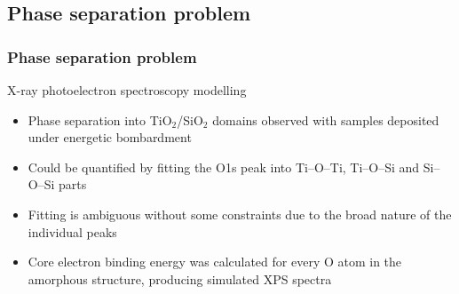 \documentclass[noamsthm,8pt,t,xcolor={dvipsnames}]{beamer}
\begin{document}
\subsection{Phase separation problem}
\begin{frame}
   \frametitle{Phase separation problem}
   \vspace{-0.45cm}
   \begin{block}{X-ray photoelectron spectroscopy modelling}
      \begin{itemize}
         \item Phase separation into TiO$_2$/SiO$_2$ domains observed with samples deposited under energetic bombardment
         \item Could be quantified by fitting the O1s peak into Ti--O--Ti, Ti--O--Si and Si--O--Si parts
         \item Fitting is ambiguous without some constraints due to the broad nature of the individual peaks
         \item Core electron binding energy was calculated for every O atom in the amorphous structure, producing simulated XPS spectra
      \end{itemize}
   \end{block}
   \begin{center}
\end{center}
\end{frame}
\end{document}
